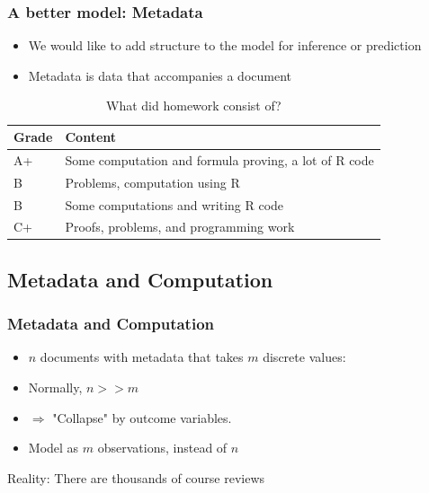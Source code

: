 \documentclass{beamer}
\begin{document}
\begin{frame}
\frametitle{A better model: Metadata}
\begin{itemize}
\item We would like to add structure to the model for inference or prediction
\pause
\item Metadata is data that accompanies a document
\pause
\end{itemize}
\begin{table}[!hbpt]
\caption{What did homework consist of?} \label{tab:title}
\pause
\begin{center}
\begin{tabular} {l l}
\textbf{Grade} & \textbf{Content} \\
\hline
A+ & Some computation and formula proving, a lot of R code \\
B & Problems, computation using R \\
B & Some computations and writing R code\\
C+ & Proofs, problems, and programming work \\  %
\end{tabular}
\end{center}
\end{table}
\end{frame}



\subsection{Metadata and Computation}
\begin{frame}
\frametitle{Metadata and Computation}
\begin{itemize}
\item $n$ documents with metadata that takes $m$ discrete values:
\item Normally, $n >> m$
\item $\Rightarrow$ "Collapse" by outcome variables. 
\item Model as $m$ observations, instead of $n$
\end{itemize}
\begin{table}[!hbpt]
\begin{center}
\end{center}
\end{table} 
\pause
Reality: There are thousands of course reviews
\end{frame}
\end{document}
